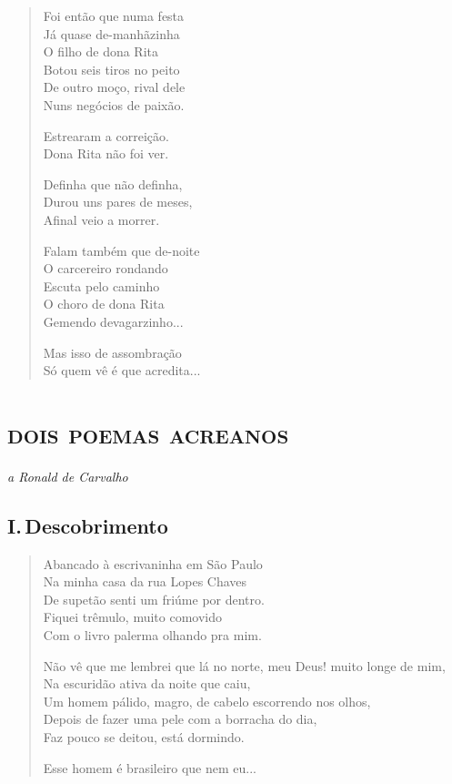 \begin{verse}
Foi então que numa festa\\
Já quase de-manhãzinha\\
O filho de dona Rita\\
Botou seis tiros no peito\\
De outro moço, rival dele\\
Nuns negócios de paixão.

Estrearam a correição.\\
Dona Rita não foi ver.

Definha que não definha,\\
Durou uns pares de meses,\\
Afinal veio a morrer.

Falam também que de-noite\\
O carcereiro rondando\\
Escuta pelo caminho\\
O choro de dona Rita\\
Gemendo devagarzinho...

Mas isso de assombração\\
Só quem vê é que acredita...
\end{verse}

\chapter[\textsc{dois poemas acreanos}\\I.\,Descobrimento]{\textsc{dois poemas acreanos}}

\begin{flushright}
\emph{a Ronald de Carvalho}
\end{flushright}

\section{I.\,Descobrimento}

\begin{verse}
Abancado à escrivaninha em São Paulo\\
Na minha casa da rua Lopes Chaves\\
De supetão senti um friúme por dentro.\\
Fiquei trêmulo, muito comovido\\
Com o livro palerma olhando pra mim.

Não vê que me lembrei que lá no norte, meu Deus! muito longe de mim,\\
Na escuridão ativa da noite que caiu,\\
Um homem pálido, magro, de cabelo escorrendo nos olhos,\\
Depois de fazer uma pele com a borracha do dia,\\
Faz pouco se deitou, está dormindo.

Esse homem é brasileiro que nem eu...
\end{verse}

